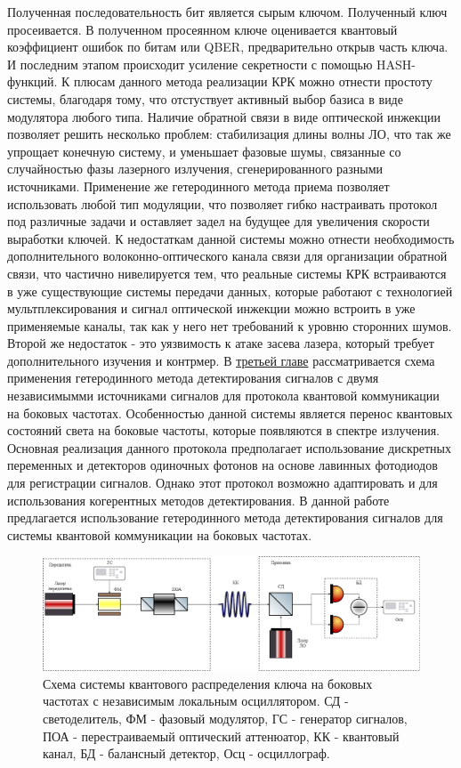 Полученная последовательность бит является сырым ключом. Полученный ключ просеивается. В полученном просеянном ключе оценивается квантовый коэффициент ошибок по битам или QBER, предварительно открыв часть ключа. И последним этапом происходит усиление секретности  с помощью HASH-функций.
\newline К плюсам данного метода реализации КРК можно отнести простоту системы, благодаря тому, что отстуствует активный выбор базиса в виде модулятора любого типа. Наличие обратной связи в виде оптической инжекции позволяет решить несколько проблем: стабилизация длины волны ЛО, что так же упрощает конечную систему, и уменьшает фазовые шумы, связанные со случайностью фазы лазерного излучения, сгенерированного разными источниками. Применение же гетеродинного метода приема позволяет использовать любой тип модуляции, что позволяет гибко настраивать протокол под различные задачи и оставляет задел на будущее для увеличения скорости выработки ключей.
\newline К недостаткам данной системы можно отнести необходимость дополнительного волоконно-оптического канала связи для организации обратной связи, что частично нивелируется тем, что реальные системы КРК встраиваются в уже существующие системы передачи данных, которые работают с технологией мультплексирования и сигнал оптической инжекции можно встроить в уже применяемые каналы, так как у него нет требований к уровню сторонних шумов. Второй же недостаток - это уязвимость к атаке засева лазера, который требует дополнительного изучения и контрмер. 
\newpage В \underline{третьей главе} рассматривается схема применения гетеродинного метода детектирования сигналов с двумя независимымми источниками сигналов для протокола квантовой коммуникации на боковых частотах. Особенностью данной системы является перенос квантовых состояний света на боковые частоты, которые появляются в спектре излучения. Основная реализация данного протокола предполагает использование дискретных переменных и детекторов одиночных фотонов на основе лавинных фотодиодов для регистрации сигналов. Однако этот протокол возможно адаптировать и для использования когерентных методов детектирования. 
\newline В данной работе предлагается использование гетеродинного метода детектирования сигналов для системы квантовой коммуникации на боковых частотах.
\begin{figure}
    \centering
    \includegraphics[width=\textwidth]{images/Гетеродин схема.png}
    \caption{Схема системы квантового распределения ключа на боковых частотах с независимым локальным осциллятором. СД - светоделитель, ФМ - фазовый модулятор, ГС - генератор сигналов, ПОА - перестраиваемый оптический аттенюатор, КК - квантовый канал, БД - балансный детектор, Осц - осциллограф.}
    \label{fig:het true scheme}
\end{figure}
